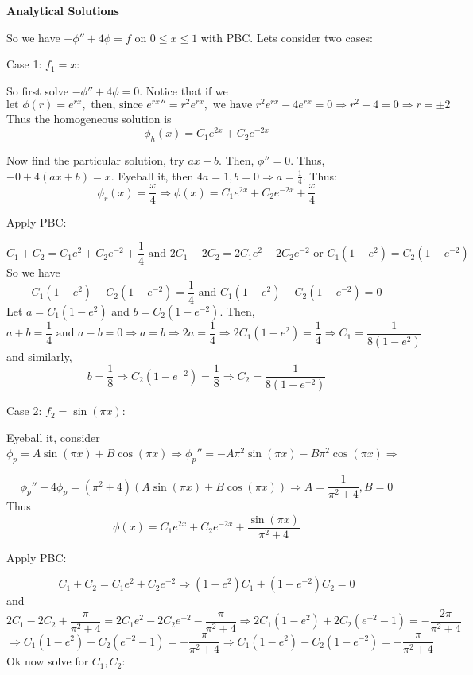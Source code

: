 \documentclass[12pt,letterpaper]{article}
\begin{document}
\textbf{Analytical Solutions}

    \medskip

    So we have $-\phi''+4\phi = f$ on $0 \leq x \leq 1$ with PBC. Lets consider two cases:

    \medskip

    Case 1: $f_1 = x$:

    \bigskip
    So first solve $-\phi '' + 4\phi = 0$. Notice that if we
\[
\text{let } \phi(r) = e^{rx}, \text{ then, since } {e^{rx}}'' = r^2 e^{rx}, \text{ we have } r^2 e^{rx} - 4 e^{rx} = 0 \Rightarrow r^2 - 4 = 0 \Rightarrow r = \pm 2
 \]
Thus the homogeneous solution is
\[
\phi_h(x) = C_1 e^{2x}+C_2 e^{-2x}
\]

Now find the particular solution, try $ax+b$. Then, $\phi'' = 0$. Thus, $-0 + 4(ax+b)=x$. Eyeball it, then $4a = 1, b=0 \Rightarrow a= \frac{1}{4}$. Thus:
\[
\phi_r (x) = \frac{x}{4} \Rightarrow \phi(x) = C_1 e^{2x}+ C_2 e^{-2x}+ \frac{x}{4}
\]
    
Apply PBC:

\[
C_1+C_2 =C_1 e^2 + C_2 e^{-2}+\frac{1}{4} \text{ and } 2C_1-2C_2 =2C_1 e^2- 2C_2e^{-2} \text{ or } C_1(1-e^2) = C_2(1-e^{-2})
\]
So we have 
\[
C_1(1-e^2) +C_2(1-e^{-2})= \frac{1}{4} \text{ and }C_1(1-e^2)-C_2(1-e^{-2})=0
\]
Let $a= C_1(1-e^2)$ and $b= C_2(1-e^{-2})$. Then,
\[
a+b=\frac{1}{4} \text{ and }a-b=0 \Rightarrow a=b \Rightarrow 2a = \frac{1}{4}\Rightarrow 2C_1(1-e^2) = \frac{1}{4} \Rightarrow C_1 = \frac{1}{8(1-e^2)}
\]
and similarly,
\[
b= \frac{1}{8} \Rightarrow C_2 (1-e^{-2})= \frac{1}{8} \Rightarrow C_2 = \frac{1}{8(1-e^{-2})}
\]

\newpage

Case 2: $f_2 = \sin(\pi x)$:

Eyeball it, consider $\phi_p = A\sin(\pi x) + B\cos(\pi x) \Rightarrow \phi_p '' = -A \pi^2 \sin(\pi x) - B\pi^2\cos(\pi x) \Rightarrow $

\[
\phi_p '' - 4\phi_p = (\pi^2+4)(A\sin(\pi x) +B\cos(\pi x) ) \Rightarrow A= \frac{1}{\pi^2 + 4}, B=0
\]
Thus
\[
\phi (x) = C_1 e^{2x}+ C_2e^{-2x}+ \frac{\sin(\pi x)}{\pi^2 +4}
\]

Apply PBC:

\[
C_1 +C_2 = C_1e^{2}+C_2e^{-2} \Rightarrow (1-e^2)C_1 + (1-e^{-2})C_2 = 0
\]
and
\[
2C_1 -2C_2+\frac{\pi }{\pi^2 +4}= 2C_1e^2 - 2C_2e^{-2}- \frac{\pi}{\pi^2+4} \Rightarrow  2C_1(1-e^2)+2C_2(e^{-2}-1)= -\frac{2\pi}{\pi^2+4} 
\]
\[
\Rightarrow C_1(1-e^2) +C_2(e^{-2}-1)= -\frac{\pi}{\pi^2 +4} \Rightarrow C_1(1-e^2) - C_2(1-e^{-2})= -\frac{\pi}{\pi^2+4}
\]
Ok now solve for $C_1,C_2:$
\end{document}
